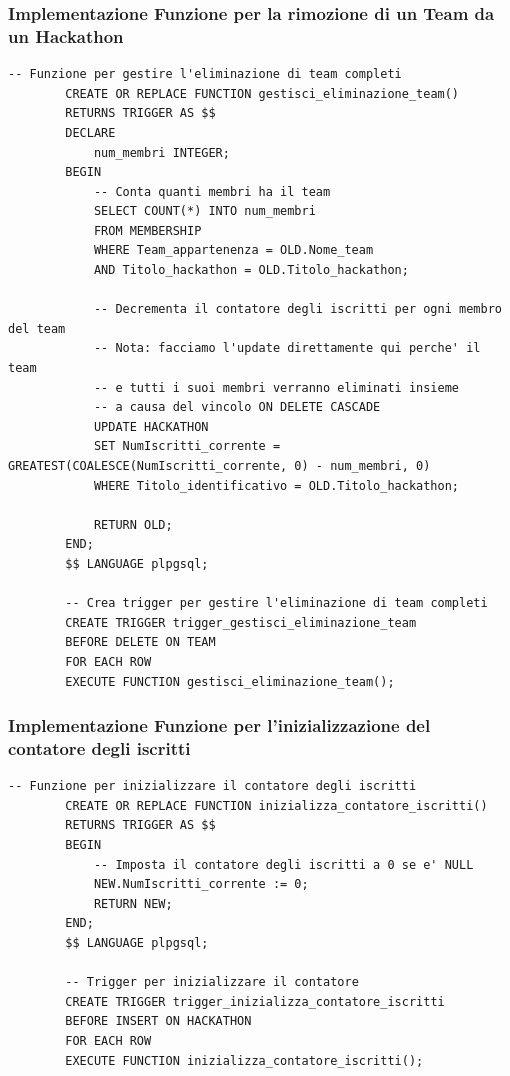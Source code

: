 \documentclass[a4paper, 10pt]{article}
\begin{document}
	\subsubsection{Implementazione Funzione per la rimozione di un Team da un Hackathon}
	\begin{lstlisting}[style=sqlstyle]
		-- Funzione per gestire l'eliminazione di team completi
		CREATE OR REPLACE FUNCTION gestisci_eliminazione_team()
		RETURNS TRIGGER AS $$
		DECLARE
			num_membri INTEGER;
		BEGIN
			-- Conta quanti membri ha il team
			SELECT COUNT(*) INTO num_membri
			FROM MEMBERSHIP
			WHERE Team_appartenenza = OLD.Nome_team
			AND Titolo_hackathon = OLD.Titolo_hackathon;
			
			-- Decrementa il contatore degli iscritti per ogni membro del team
			-- Nota: facciamo l'update direttamente qui perche' il team 
			-- e tutti i suoi membri verranno eliminati insieme 
			-- a causa del vincolo ON DELETE CASCADE
			UPDATE HACKATHON
			SET NumIscritti_corrente = GREATEST(COALESCE(NumIscritti_corrente, 0) - num_membri, 0)
			WHERE Titolo_identificativo = OLD.Titolo_hackathon;
			
			RETURN OLD;
		END;
		$$ LANGUAGE plpgsql;
		
		-- Crea trigger per gestire l'eliminazione di team completi
		CREATE TRIGGER trigger_gestisci_eliminazione_team
		BEFORE DELETE ON TEAM
		FOR EACH ROW
		EXECUTE FUNCTION gestisci_eliminazione_team();
	\end{lstlisting}
	\newpage
	\subsubsection{Implementazione Funzione per l'inizializzazione del contatore degli iscritti}
	\begin{lstlisting}[style=sqlstyle]
		-- Funzione per inizializzare il contatore degli iscritti
		CREATE OR REPLACE FUNCTION inizializza_contatore_iscritti()
		RETURNS TRIGGER AS $$
		BEGIN
			-- Imposta il contatore degli iscritti a 0 se e' NULL
			NEW.NumIscritti_corrente := 0;
			RETURN NEW;
		END;
		$$ LANGUAGE plpgsql;
		
		-- Trigger per inizializzare il contatore
		CREATE TRIGGER trigger_inizializza_contatore_iscritti
		BEFORE INSERT ON HACKATHON
		FOR EACH ROW
		EXECUTE FUNCTION inizializza_contatore_iscritti();
	\end{lstlisting}
	
\end{document}
